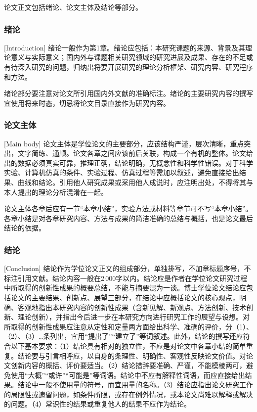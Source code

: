 论文正文包括绪论、论文主体及结论等部分。

\subsubsection{绪论}[Introduction]
绪论一般作为第1章。绪论应包括：本研究课题的来源、背景及其理论意义与实际意义；国内外与课题相关研究领域的研究进展及成果、存在的不足或有待深入研究的问题，归纳出将要开展研究的理论分析框架、研究内容、研究程序和方法。

绪论部分要注意对论文所引用国内外文献的准确标注。绪论的主要研究内容的撰写宜使用将来时态，切忌将论文目录直接作为研究内容。

\subsubsection{论文主体}[Main body]
论文主体是学位论文的主要部分，应该结构严谨，层次清晰，重点突出，文字简练、通顺。论文各章之间应该前后关联，构成一个有机的整体。论文给出的数据必须真实可靠，推理正确，结论明确，无概念性和科学性错误。对于科学实验、计算机仿真的条件、实验过程、仿真过程等需加以叙述，避免直接给出结果、曲线和结论。引用他人研究成果或采用他人成说时，应注明出处，不得将其与本人提出的理论分析混淆在一起。

论文主体各章后应有一节“本章小结”，实验方法或材料等章节可不写“本章小结”。各章小结是对各章研究内容、方法与成果的简洁准确的总结与概括，也是论文最后结论的依据。

\subsubsection{结论}[Conclusion]
结论作为学位论文正文的组成部分，单独排写，不加章标题序号，不标注引用文献。结论内容一般在2\,000字以内。结论应是作者在学位论文研究过程中所取得的创新性成果的概要总结，不能与摘要混为一谈。博士学位论文结论应包括论文的主要结果、创新点、展望三部分，在结论中应概括论文的核心观点，明确、客观地指出本研究内容的创新性成果（含新见解、新观点、方法创新、技术创新、理论创新），并指出今后进一步在本研究方向进行研究工作的展望与设想。对所取得的创新性成果应注意从定性和定量两方面给出科学、准确的评价，分（1）、（2）、（3）…条列出，宜用“提出了”“建立了”等词叙述。此外，结论的撰写还应符合以下基本要求：（1）结论具有相对的独立性，不应是对论文中各章小结的简单重复。结论要与引言相呼应，以自身的条理性、明确性、客观性反映论文价值。对论文创新内容的概括、评价要适当。（2）结论措辞要准确、严谨，不能模棱两可，避免使用“大概”“或许”“可能是”等词语。结论中不应有解释性词语，而应直接给出结果。结论中一般不使用量的符号，而宜用量的名称。（3）结论应指出论文研究工作的局限性或遗留问题，如条件所限，或存在例外情况，或本论文尚难以解释或解决的问题。（4）常识性的结果或重复他人的结果不应作为结论。

